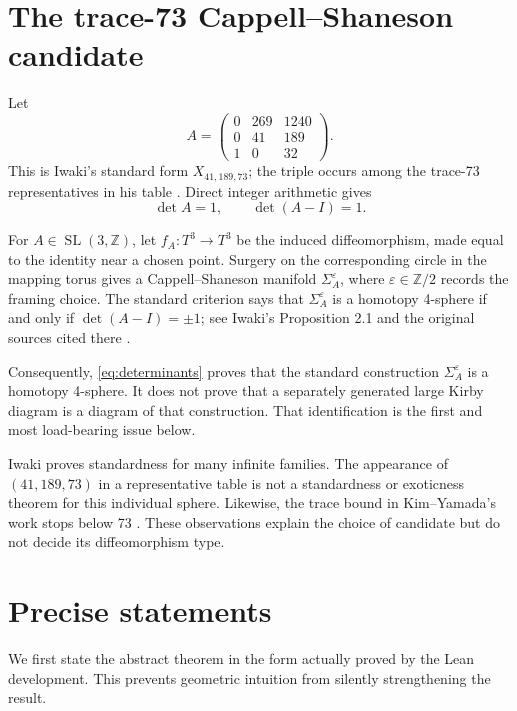 \documentclass[11pt]{amsart}
\theoremstyle{definition}
\theoremstyle{remark}
\newcommand{\Z}{\mathbb{Z}}
\begin{document}
\section{The trace-73 Cappell--Shaneson candidate}

Let
\begin{equation}\label{eq:A}
A=\begin{pmatrix}
0&269&1240\\
0&41&189\\
1&0&32
\end{pmatrix}.
\end{equation}
This is Iwaki's standard form $X_{41,189,73}$; the triple occurs among the
trace-73 representatives in his table \cite[Table 2]{Iwaki2024}.  Direct
integer arithmetic gives
\begin{equation}\label{eq:determinants}
\det A=1,\qquad \det(A-I)=1.
\end{equation}

For $A\in \operatorname{SL}(3,\Z)$, let $f_A:T^3\to T^3$ be the induced
diffeomorphism, made equal to the identity near a chosen point.  Surgery on
the corresponding circle in the mapping torus gives a
Cappell--Shaneson manifold $\Sigma_A^\varepsilon$, where
$\varepsilon\in\Z/2$ records the framing choice.  The standard criterion says
that $\Sigma_A^\varepsilon$ is a homotopy 4-sphere if and only if
$\det(A-I)=\pm1$; see Iwaki's Proposition 2.1 and the original sources cited
there \cite{Iwaki2024,CappellShaneson1976}.

Consequently, \eqref{eq:determinants} proves that the standard construction
$\Sigma_A^\varepsilon$ is a homotopy 4-sphere.  It does not prove that a
separately generated large Kirby diagram is a diagram of that construction.
That identification is the first and most load-bearing issue below.

Iwaki proves standardness for many infinite families.  The appearance of
$(41,189,73)$ in a representative table is not a standardness or exoticness
theorem for this individual sphere.  Likewise, the trace bound in
Kim--Yamada's work stops below 73 \cite{KimYamada2017}.  These observations
explain the choice of candidate but do not decide its diffeomorphism type.

\section{Precise statements}

We first state the abstract theorem in the form actually proved by the Lean
development.  This prevents geometric intuition from silently strengthening
the result.
\end{document}
